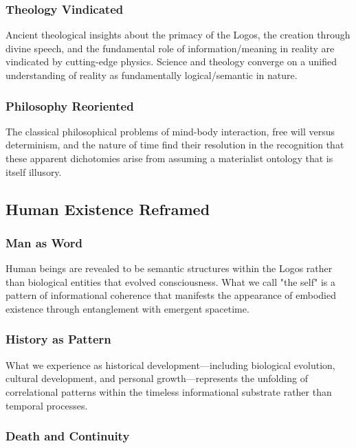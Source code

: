 \documentclass[12pt,a4paper]{article}
\begin{document}
\subsubsection{Theology Vindicated}

Ancient theological insights about the primacy of the Logos, the creation through divine speech, and the fundamental role of information/meaning in reality are vindicated by cutting-edge physics. Science and theology converge on a unified understanding of reality as fundamentally logical/semantic in nature.

\subsubsection{Philosophy Reoriented}

The classical philosophical problems of mind-body interaction, free will versus determinism, and the nature of time find their resolution in the recognition that these apparent dichotomies arise from assuming a materialist ontology that is itself illusory.

\subsection{Human Existence Reframed}

\subsubsection{Man as Word}

Human beings are revealed to be semantic structures within the Logos rather than biological entities that evolved consciousness. What we call "the self" is a pattern of informational coherence that manifests the appearance of embodied existence through entanglement with emergent spacetime.

\subsubsection{History as Pattern}

What we experience as historical development—including biological evolution, cultural development, and personal growth—represents the unfolding of correlational patterns within the timeless informational substrate rather than temporal processes.

\subsubsection{Death and Continuity}
\end{document}

